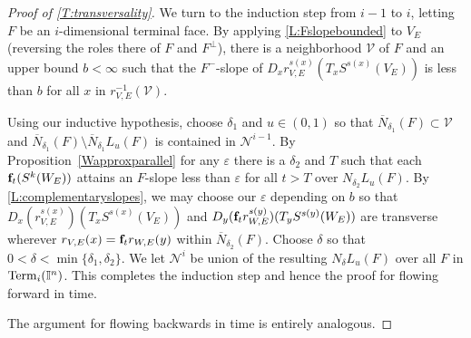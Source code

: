 \begin{proof}[Proof of \cref{T:transversality}]
	We turn to the induction step from $i-1$ to $i$, letting $F$ be an $i$-dimensional terminal face.
	By applying \cref{L:Fslopebounded} to $V_E$ (reversing the roles there of $F$ and $F^\perp$),
	there is a neighborhood $\mathcal{V}$ of $F$ and an upper bound $b < \infty$ such that
	the $F^-$-slope of $D_xr^{s(x)}_{V,E}(T_xS^{s(x)}(V_E))$ is less than $b$ for all $x$ in $r_{V,E}^{-1}(\mathcal{V})$.


	Using our inductive hypothesis, choose $\delta_1$ and $u \in (0, 1)$ so that $\overline N_{\delta_1}(F) \subset \mathcal{V}$ and $\overline N_{\delta_1}(F) \setminus \overline N_{\delta_1} L_u(F)$ is contained in $\mathcal N^{i-1}$.
	By Proposition~\ref{Wapproxparallel} for any $\varepsilon$ there is a $\delta_2$ and $T$
	such that each $\mathbf{f}_t(S^k(W_E))$ attains an $F$-slope less than $\varepsilon$ for all $t>T$ over $N_{\delta_2} L_u(F)$.
	By \cref{L:complementaryslopes}, we may choose our $\varepsilon$ depending on $b$ so that $D_x(r^{s(x)}_{V,E})(T_xS^{s(x)}(V_E))$ and $D_y(\mathbf{f}_tr^{s(y)}_{W,E})(T_yS^{s(y)}(W_E))$ are transverse wherever $r_{V,E}(x) = \mathbf{f}_tr_{W,E}(y)$ within $\overline N_{\delta_2}(F)$.
	Choose $\delta$ so that $0 < \delta < \min\{\delta_1,\delta_2\}$.
	We let $\mathcal N^i$ be union of the resulting $N_{\delta} L_u(F)$ over all $F$ in ${\rm Term}_i(\mathbb{I}^n)$.
	This completes the induction step and hence the proof for flowing forward in time.

	The argument for flowing backwards in time is entirely analogous.
\end{proof}


\begin{comment}
	We claim that if $r_{V,E}$ is complementary to $F$ and $\f_t(W)_{\E}$ is sufficiently parallel to $F$ then $r_{V,E}$
	will be transverse to $\f_t(W)_{\E}$.
	Let $y \in \overline N_{\delta_V}(F)$ be in the image of both
	$r_{V,E}$ and $\f_t(W)_{\E}$.
	First, let $r_{V,E} (x) = y$ and let $\alpha_x$ be the maximum of absolute values of
	all determinants of $u_1, \ldots, u_k$ which are unit vectors in the image of $D_x r_{V,E}$ followed by $b_1, \ldots, b_{n-k}$
	which are unit vectors in $\R^F$, as $k$ can vary.
	Because
	$r_{V,E}$ is complementary to $F$, this must be non-zero (and finite as we restrict to unit vectors).
	Because the preimage of $y$ in $V$ is compact,
	there is a non-zero minimum $\alpha_x$ over the preimage, which we call $\alpha_y$.
	Similarly, because the intersection
	of the images of $r_{V,E}$ and $\f_t(W)_{\E}$ is compact, there is a non-zero minimum of all $\alpha_y$ which we call $\alpha$.
	We choose $\varepsilon$ to be sufficiently small compared to $\alpha$ to apply Proposition~\ref{Wapproxparallel} to
	guarantee that the determinants
	of unit vectors from $D r_{V,E}$ and $D \f_t (r_W)_{\E}$ are sufficiently close to those from $D r_{V,E}$ and $\R^F$,
	which are bounded below by $\alpha$, to be non-zero.
	This establishes transversality in a neighborhood of $F$ for sufficiently large $t$,
	letting $\delta$ be the smaller of $\delta_V$ and $\delta_W$.
	The induction step is completed by taking $\mathcal N^i$ to be the union over all terminal faces of $N_\delta(F)$ and $T^i$ the maximum value of their associated $t$.
\end{comment}

